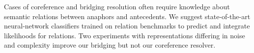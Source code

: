 Cases of coreference and bridging resolution often require knowledge about semantic relations between anaphors and antecedents. We suggest state-of-the-art neural-network classifiers trained on relation benchmarks to predict and integrate likelihoods for relations. Two experiments with representations differing in noise and complexity improve our bridging but not our coreference resolver.
